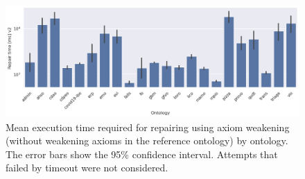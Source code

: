 \begin{figure}[htbp]
  \centering
  \includegraphics[width=\textwidth]{resources/time-enhance-ontology-bar.png}
  \caption{Mean execution time required for repairing using axiom weakening (without weakening axioms in the reference ontology) by ontology. The error bars show the 95\% confidence interval. Attempts that failed by timeout were not considered.}
\end{figure}

